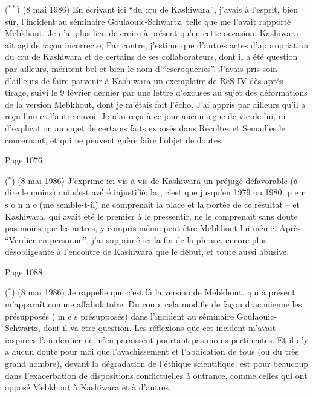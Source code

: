 ($^{**}$) (8 mai 1986) En écrivant ici ``du cru de Kashiwara'', j'avais à l'esprit, bien sûr, l'incident au séminaire Goulaouic-Schwartz, telle que me l'avait rapporté Mebkhout. Je n'ai plus lieu de croire à présent qu'en cette occasion, Kashiwara ait agi de façon incorrecte,  Par contre, j'estime que d'autres actes d'appropriation du cru de Kashiwara et de certains de ses collaborateurs, dont il a été question par ailleurs, méritent bel et bien le nom d'``escroqueries''. J'avais pris soin d'ailleurs de faire parvenir à Kashiwara  un exemplaire de ReS IV dès après tirage, suivi le 9 février dernier par une lettre d'excuses au sujet des déformations de la version Mebkhout, dont je m'étais fait l'écho. J'ai appris par ailleurs qu'il a reçu l'un et l'autre envoi. \handwritten{\unsure{,}} Je n'ai reçu à ce jour aucun signe de vie de lui, ni d'explication au sujet de certains faits exposés dans Récoltes et Semailles le concernant, et qui ne peuvent guère faire l'objet de doutes.

Page 1076

($^{*}$) (8 mai 1986) J'exprime ici vis-à-vis de Kashiwara un préjugé défavorable (à dire le moins) qui s'est avéré injustifié: la , c'est que jusqu'en 1979 ou 1980, p e r s o n n e (me semble-t-il)  ne comprenait la place et la portée de ce résultat -- et Kashiwara, qui avait été le premier à le pressentir, ne le comprenait sans doute pas moins que les autres, y compris même peut-être Mebkhout lui-même. Après ``Verdier en personne'', j'ai supprimé ici la fin de la phrase, encore plus désobligeante à l'encontre de Kashiwara que le début, et toute aussi abusive.

Page 1088

($^{*}$) (8 mai 1986) Je rappelle que c'est là la version de Mebkhout, qui à présent m'apparaît comme affabulatoire. Du coup, cela modifie de façon draconienne les présupposés ( m e s présupposés) dans l'incident au séminaire Goulaouic-Schwartz, dont il va être question. Les réflexions que cet incident m'avait inspirées l'an dernier ne m'en paraissent pourtant pas moins pertinentes. Et il n'y a aucun doute pour moi que l'avachissement et l'abdication de tous (ou du très grand nombre), devant la dégradation de l'éthique scientifique, est pour beaucoup dans l'exacerbation de dispositions conflictuelles à outrance, comme celles qui ont opposé Mebkhout à Kashiwara\deleted{\unsure{,}} et à d'autres.

